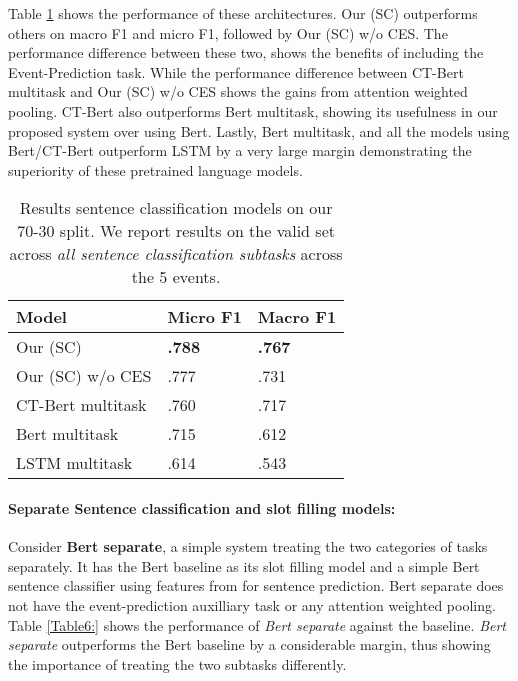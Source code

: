 \documentclass[11pt,a4paper]{article}
\begin{document}
Table \ref{Table5:} shows the performance of these architectures. Our (SC) outperforms others on macro F1 and micro F1, followed by Our (SC) w/o CES. The performance difference between these two, shows the benefits of including the Event-Prediction task. While the performance difference between CT-Bert multitask and Our (SC) w/o CES shows the gains from attention weighted pooling. CT-Bert also outperforms Bert multitask, showing its usefulness in our proposed system over using Bert. Lastly, Bert multitask, and all the models using Bert/CT-Bert outperform LSTM by a very large margin demonstrating the superiority of these pretrained language models.

\begin{table}
 \begin{center}
  \begin{tabular}{p{3cm}p{1.5cm}p{1.5cm}}
    \hline
    Model & Micro F1 & Macro F1\\ 
    \hline
    Our (SC) & \textbf{.788} & \textbf{.767} \\
    Our (SC) w/o CES & .777 & .731\\
    CT-Bert multitask & .760 & .717 \\
    Bert multitask & .715 & .612\\
    LSTM multitask & .614 & .543\\
    \hline

  \end{tabular}
  \caption{\label{Table5:} Results sentence classification models on our 70-30 split. We report results on the valid set across \textit{all sentence classification subtasks} across the 5 events.}
 \end{center}
\end{table}

\paragraph{Separate Sentence classification and slot filling models:} Consider \textbf{Bert separate}, a simple system treating the two categories of tasks separately. It has the Bert baseline as its slot filling model and a simple Bert sentence classifier using features from  for sentence prediction. Bert separate does not have the event-prediction auxilliary task or any attention weighted pooling. Table \ref{Table6:} shows the performance of \textit{Bert separate} against the baseline. \textit{Bert separate} outperforms the Bert baseline by a considerable margin, thus showing the importance of treating the two subtasks differently.
\end{document}
